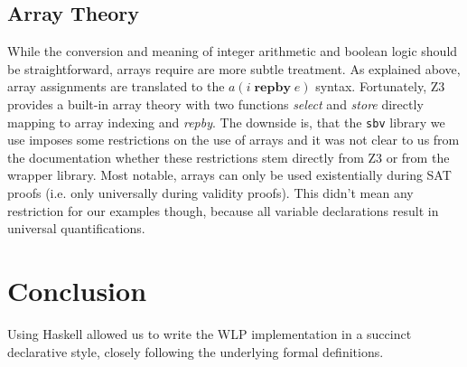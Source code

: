 \documentclass[]{scrartcl}
\newcommand{\REPBY}[2]{\ensuremath{#1\;\mathbf{repby}\;#2}}
\begin{document}
\subsection{Array Theory}

While the conversion and meaning of integer arithmetic and boolean logic should be
straightforward, arrays require are more subtle treatment.
As explained above, array assignments are translated to the $a(\REPBY{i}{e})$ syntax.
Fortunately, Z3 provides a built-in array theory with two functions \emph{select} and
\emph{store} directly mapping to array indexing and \emph{repby}.
The downside is, that the \texttt{sbv} library we use imposes some restrictions on the
use of arrays and it was not clear to us from the documentation whether these restrictions
stem directly from Z3 or from the wrapper library.
Most notable, arrays can only be used existentially during SAT proofs (i.e. only universally
during validity proofs).
This didn't mean any restriction for our examples though, because all variable declarations
result in universal quantifications.

\section{Conclusion}

Using Haskell allowed us to write the WLP implementation in a succinct declarative
style, closely following the underlying formal definitions.

\end{document}

